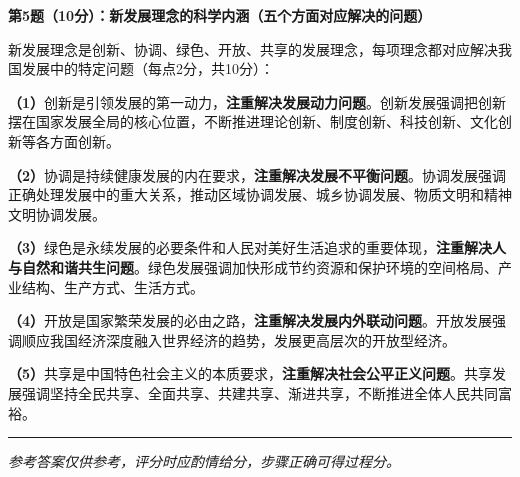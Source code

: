 \documentclass[12pt, a4paper]{article}
\newcommand{\examrule}{\noindent\rule{\linewidth}{0.6pt}}
\begin{document}
\begin{answerbox}

\textbf{第5题（10分）：新发展理念的科学内涵（五个方面对应解决的问题）}

新发展理念是创新、协调、绿色、开放、共享的发展理念，每项理念都对应解决我国发展中的特定问题（每点2分，共10分）：

\textbf{（1）}创新是引领发展的第一动力，\textbf{注重解决发展动力问题}。创新发展强调把创新摆在国家发展全局的核心位置，不断推进理论创新、制度创新、科技创新、文化创新等各方面创新。

\textbf{（2）}协调是持续健康发展的内在要求，\textbf{注重解决发展不平衡问题}。协调发展强调正确处理发展中的重大关系，推动区域协调发展、城乡协调发展、物质文明和精神文明协调发展。

\textbf{（3）}绿色是永续发展的必要条件和人民对美好生活追求的重要体现，\textbf{注重解决人与自然和谐共生问题}。绿色发展强调加快形成节约资源和保护环境的空间格局、产业结构、生产方式、生活方式。

\textbf{（4）}开放是国家繁荣发展的必由之路，\textbf{注重解决发展内外联动问题}。开放发展强调顺应我国经济深度融入世界经济的趋势，发展更高层次的开放型经济。

\textbf{（5）}共享是中国特色社会主义的本质要求，\textbf{注重解决社会公平正义问题}。共享发展强调坚持全民共享、全面共享、共建共享、渐进共享，不断推进全体人民共同富裕。

\end{answerbox}

\vspace{12pt}
\examrule
\begin{center}
  \textit{参考答案仅供参考，评分时应酌情给分，步骤正确可得过程分。}
\end{center}
\end{document}
